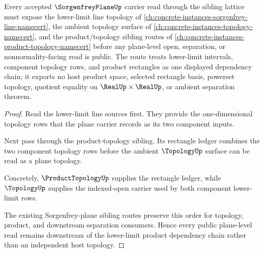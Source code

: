 \begin{theorem}
\label{thm:sorgenfrey-plane-lower-limit-product-sibling-dependency}
Every accepted $\SorgenfreyPlaneUp$ carrier read through the sibling lattice must expose the lower-limit line topology of \autoref{ch:concrete-instances-sorgenfrey-line-namecert}, the ambient topology surface of \autoref{ch:concrete-instances-topology-namecert}, and the product/topology sibling routes of \autoref{ch:concrete-instances-product-topology-namecert} before any plane-level open, separation, or nonnormality-facing read is public. The route treats lower-limit intervals, component topology rows, and product rectangles as one displayed dependency chain; it exports no host product space, selected rectangle basis, powerset topology, quotient equality on $\RealUp\times\RealUp$, or ambient separation theorem.
\end{theorem}
\begin{proof}
Read the lower-limit line sources first. They provide the one-dimensional topology rows that the plane carrier records as its two component inputs.

Next pass through the product-topology sibling. Its rectangle ledger combines the two component topology rows before the ambient $\TopologyUp$ surface can be read as a plane topology.

Concretely, $\ProductTopologyUp$ supplies the rectangle ledger, while $\TopologyUp$ supplies the indexed-open carrier used by both component lower-limit rows.

The existing Sorgenfrey-plane sibling routes preserve this order for topology, product, and downstream separation consumers. Hence every public plane-level read remains downstream of the lower-limit product dependency chain rather than an independent host topology.
\end{proof}
